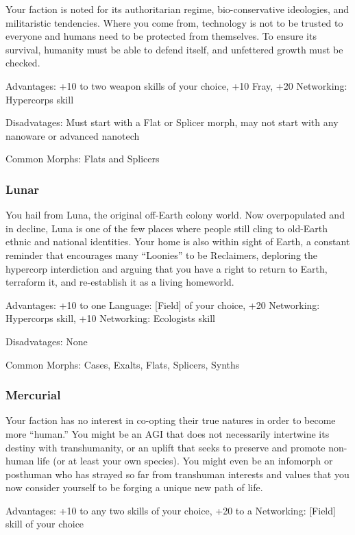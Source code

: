 Your faction is noted for its authoritarian regime, bio-conservative ideologies, and militaristic tendencies. Where you come from, technology is not to be trusted to everyone and humans need to be protected from themselves. To ensure its survival, humanity must be able to defend itself, and unfettered growth must be checked. 

Advantages: +10 to two weapon skills of your choice, +10 Fray, +20 Networking: Hypercorps skill 

Disadvatages: Must start with a Flat or Splicer morph, may not start with any nanoware or advanced nanotech 

Common Morphs: Flats and Splicers 

\subsubsection{Lunar} \label{sec:lunar} 

You hail from Luna, the original off-Earth colony world. Now overpopulated and in decline, Luna is one of the few places where people still cling to old-Earth ethnic and national identities. Your home is also within sight of Earth, a constant reminder that encourages many “Loonies” to be Reclaimers, deploring the hypercorp interdiction and arguing that you have a right to return to Earth, terraform it, and re-establish it as a living homeworld. 

Advantages: +10 to one Language: [Field] of your choice, +20 Networking: Hypercorps skill, +10 Networking: Ecologists skill 

Disadvatages: None 

Common Morphs: Cases, Exalts, Flats, Splicers, Synths 

\subsubsection{Mercurial} \label{sec:mercurial} 

Your faction has no interest in co-opting their true natures in order to become more “human.” You might be an AGI that does not necessarily intertwine its destiny with transhumanity, or an uplift that seeks to preserve and promote non-human life (or at least your own species). You might even be an infomorph or posthuman who has strayed so far from transhuman interests and values that you now consider yourself to be forging a unique new path of life. 

Advantages: +10 to any two skills of your choice, +20 to a Networking: [Field] skill of your choice 

